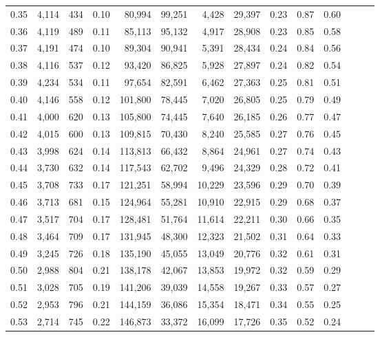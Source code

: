 \begin{tabular}{rrrrrrrrrrrrrr}
0.35 &  4,114 &  434 &  0.10 &   80,994 &   99,251 &   4,428 &  29,397 &  0.23 &  0.87 &      0.60 \\
0.36 &  4,119 &  489 &  0.11 &   85,113 &   95,132 &   4,917 &  28,908 &  0.23 &  0.85 &      0.58 \\
0.37 &  4,191 &  474 &  0.10 &   89,304 &   90,941 &   5,391 &  28,434 &  0.24 &  0.84 &      0.56 \\
0.38 &  4,116 &  537 &  0.12 &   93,420 &   86,825 &   5,928 &  27,897 &  0.24 &  0.82 &      0.54 \\
0.39 &  4,234 &  534 &  0.11 &   97,654 &   82,591 &   6,462 &  27,363 &  0.25 &  0.81 &      0.51 \\
0.40 &  4,146 &  558 &  0.12 &  101,800 &   78,445 &   7,020 &  26,805 &  0.25 &  0.79 &      0.49 \\
0.41 &  4,000 &  620 &  0.13 &  105,800 &   74,445 &   7,640 &  26,185 &  0.26 &  0.77 &      0.47 \\
0.42 &  4,015 &  600 &  0.13 &  109,815 &   70,430 &   8,240 &  25,585 &  0.27 &  0.76 &      0.45 \\
0.43 &  3,998 &  624 &  0.14 &  113,813 &   66,432 &   8,864 &  24,961 &  0.27 &  0.74 &      0.43 \\
0.44 &  3,730 &  632 &  0.14 &  117,543 &   62,702 &   9,496 &  24,329 &  0.28 &  0.72 &      0.41 \\
0.45 &  3,708 &  733 &  0.17 &  121,251 &   58,994 &  10,229 &  23,596 &  0.29 &  0.70 &      0.39 \\
0.46 &  3,713 &  681 &  0.15 &  124,964 &   55,281 &  10,910 &  22,915 &  0.29 &  0.68 &      0.37 \\
0.47 &  3,517 &  704 &  0.17 &  128,481 &   51,764 &  11,614 &  22,211 &  0.30 &  0.66 &      0.35 \\
0.48 &  3,464 &  709 &  0.17 &  131,945 &   48,300 &  12,323 &  21,502 &  0.31 &  0.64 &      0.33 \\
0.49 &  3,245 &  726 &  0.18 &  135,190 &   45,055 &  13,049 &  20,776 &  0.32 &  0.61 &      0.31 \\
0.50 &  2,988 &  804 &  0.21 &  138,178 &   42,067 &  13,853 &  19,972 &  0.32 &  0.59 &      0.29 \\
0.51 &  3,028 &  705 &  0.19 &  141,206 &   39,039 &  14,558 &  19,267 &  0.33 &  0.57 &      0.27 \\
0.52 &  2,953 &  796 &  0.21 &  144,159 &   36,086 &  15,354 &  18,471 &  0.34 &  0.55 &      0.25 \\
0.53 &  2,714 &  745 &  0.22 &  146,873 &   33,372 &  16,099 &  17,726 &  0.35 &  0.52 &      0.24 \\

\end{tabular}
